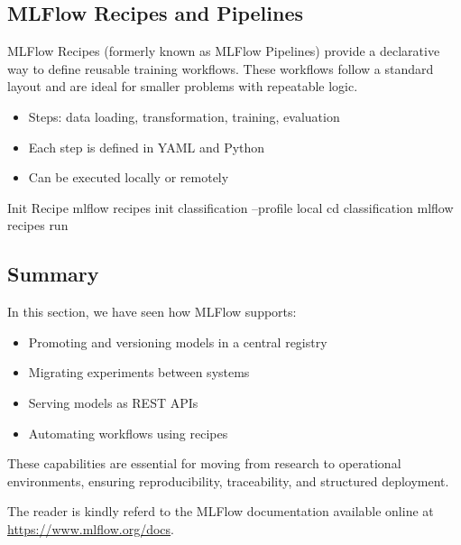 %
\subsection{MLFlow Recipes and Pipelines}

MLFlow Recipes (formerly known as MLFlow Pipelines) provide a declarative way to define reusable training workflows. These workflows follow a standard layout and are ideal for smaller problems with repeatable logic.

\begin{itemize}
    \item Steps: data loading, transformation, training, evaluation
    \item Each step is defined in YAML and Python
    \item Can be executed locally or remotely
\end{itemize}

\begin{codeonly}{Init Recipe}
mlflow recipes init classification --profile local
cd classification
mlflow recipes run
\end{codeonly}

%
\subsection{Summary}

In this section, we have seen how MLFlow supports:

\begin{itemize}
    \item Promoting and versioning models in a central registry
    \item Migrating experiments between systems
    \item Serving models as REST APIs
    \item Automating workflows using recipes
\end{itemize}

These capabilities are essential for moving from research to operational environments, ensuring reproducibility, traceability, and structured deployment.

The reader is kindly referd to the MLFlow documentation available online at \url{https://www.mlflow.org/docs}.